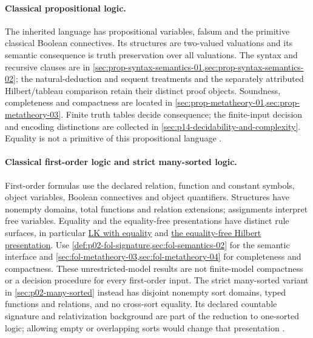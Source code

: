 \paragraph{Classical propositional logic.}
\label{entry:p14-directory-cpl}
The inherited language has propositional variables, falsum and the
primitive classical Boolean connectives. Its structures are two-valued
valuations and its semantic consequence is truth preservation over all
valuations. The syntax and recursive clauses are in
\cref{sec:prop-syntax-semantics-01,sec:prop-syntax-semantics-02}; the
natural-deduction and sequent treatments and the separately attributed
Hilbert/tableau comparison retain their distinct proof objects. Soundness,
completeness and compactness are located in
\cref{sec:prop-metatheory-01,sec:prop-metatheory-03}.
Finite truth tables decide consequence; the finite-input decision and
encoding distinctions are collected in
\cref{sec:p14-decidability-and-complexity}. Equality is not a primitive
of this propositional language \cite{Enderton2001,Mendelson1997}.

\paragraph{Classical first-order logic and strict many-sorted logic.}
\label{entry:p14-directory-fol}
First-order formulas use the declared relation, function and constant
symbols, object variables, Boolean connectives and object quantifiers.
Structures have nonempty domains, total functions and relation extensions;
assignments interpret free variables. Equality and the equality-free
presentations have distinct rule surfaces, in particular
\hyperref[sheet:lk-eq]{LK with equality} and
\hyperref[sheet:hilbert-fol]{the equality-free Hilbert presentation}.
Use \cref{def:p02-fol-signature,sec:fol-semantics-02} for the semantic
interface and \cref{sec:fol-metatheory-03,sec:fol-metatheory-04} for completeness and
compactness. These unrestricted-model results are not finite-model
compactness or a decision procedure for every first-order input.
The strict many-sorted variant in \cref{sec:p02-many-sorted} instead
has disjoint nonempty sort domains, typed functions and relations, and
no cross-sort equality. Its declared countable signature and relativization
background are part of the reduction to one-sorted logic; allowing empty or
overlapping sorts would change that presentation \cite{Enderton2001,Manzano1996}.


